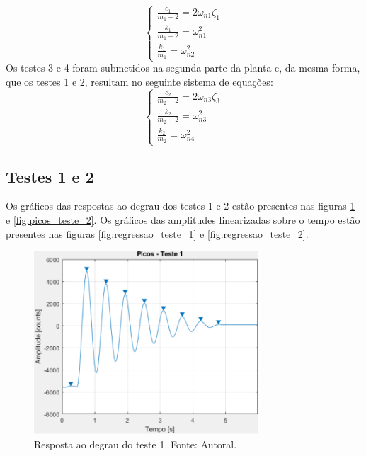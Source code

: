 \documentclass{ifacconf}
\begin{document}
\begin{equation}
  \label{eq:sistema1}
  \left\{
\begin{array}{lr}
  \frac{c_1}{m_1 + 2} = 2\omega_{n1} \zeta_1 \\
  \frac{k_1}{m_1 + 2} = \omega_{n1}^2 \\
  \frac{k_1}{m_1} = \omega_{n2}^2
\end{array}
\right. 
\end{equation}
Os testes 3 e 4 foram submetidos na segunda parte da planta e, da mesma forma, que os testes 1 e 2, resultam no seguinte
sistema de equações:
\begin{equation}
  \label{eq:sistema21}
  \left\{
\begin{array}{lr}
  \frac{c_2}{m_2 + 2} = 2\omega_{n3} \zeta_3 \\
  \frac{k_2}{m_2 + 2} = \omega_{n3}^2 \\
  \frac{k_2}{m_2} = \omega_{n4}^2
\end{array}
\right. 
\end{equation}

\subsection{Testes 1 e 2}
Os gráficos das respostas ao degrau dos testes 1 e 2 estão presentes nas figuras \ref{fig:picos_teste_1} e \ref{fig:picos_teste_2}.
Os gráficos das amplitudes linearizadas sobre o tempo estão presentes nas figuras \ref{fig:regressao_teste_1} e \ref{fig:regressao_teste_2}.
\begin{figure}[!htb]
  \begin{center}
  \includegraphics[width=8.4cm]{figures/picos_teste_1.png}    %
  \caption{Resposta ao degrau do teste 1. Fonte: Autoral.} 
  \label{fig:picos_teste_1}
  \end{center}
\end{figure}
\end{document}
